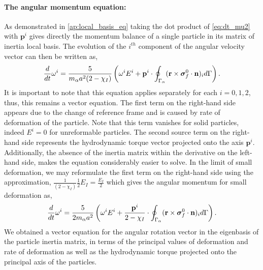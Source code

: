 \paragraph*{The angular momentum equation:}
As demonstrated in \ref{ap:local_basis_eq} taking the dot product of \ref{eq:dt_mu2} with $\textbf{p}^i$ gives directly the momentum balance of a single particle in its matrix of inertia local basis. 
The evolution of the $i^{th}$ component of the angular velocity vector can then be written as, 
\begin{align*}
    \frac{d}{dt}\omega^i 
    = 
    \frac{5}{m_\alpha a^2 (2 - \chi_I)}
    \left(
    \omega^i E^i 
    +
    \textbf{p}^i\cdot \oint_{\Gamma_{\alpha}} (\textbf{r}\times\bm\sigma_f^0\cdot \textbf{n})_i d\Gamma 
    \right).    
\end{align*}
It is important to note that this equation applies separately for each $i = 0,1,2$, thus, this remains a vector equation. 
The first term on the right-hand side appears due to the change of reference frame and is caused by rate of deformation of the particle.
Note that this term vanishes for solid particles, indeed $E^i = 0$ for unreformable particles. 
The second source term on the right-hand side represents the hydrodynamic torque vector projected onto the axis $\textbf{p}^i$. 
Additionally, the absence of the inertia matrix within the derivative on the left-hand side, makes the equation considerably easier to solve.
In the limit of small deformation, we may reformulate the first term on the right-hand side using the approximation, 
$
    \frac{1}{(2-\chi_I)} \frac{1}{2} E_I 
    = \frac{E_I}{2}
$
which gives the angular momentum for small deformation as, 
\begin{align*}
    \ddt\omega^i 
    = 
    \frac{5}{ 2 m_\alpha a^2}
    \left(
    \omega^i E^i
    +
    \frac{\textbf{p}^i}{2 - \chi_I}\cdot \intS{(\textbf{r}\times\bm\sigma_f^0\cdot \textbf{n})_i} 
    \right).    
    \label{eq:dt_omega_I}
\end{align*}
We obtained a vector equation for the angular rotation vector in the eigenbasis of the particle inertia matrix, in terms of the principal values of deformation and rate of deformation as well as the hydrodynamic torque projected onto the principal axis of the particles.  



